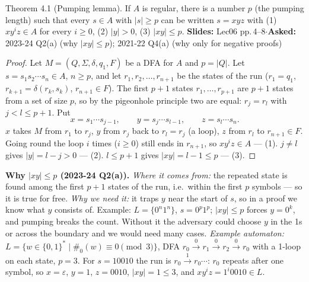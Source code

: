 \documentclass[10.5pt,a4paper]{article}
\newcommand{\src}[2]{{\footnotesize\color{gray!70!black}\textbf{Slides:} #1\enspace$\cdot$\enspace\textbf{Asked:} #2}\par}
\newcommand{\eps}{\varepsilon}
\begin{document}
\begin{thm}{Theorem 4.1 (Pumping lemma). If $A$ is regular, there is a number $p$ (the pumping length) such that every $s\in A$ with
$|s|\ge p$ can be written $s=xyz$ with (1) $xy^iz\in A$ for every $i\ge0$, (2) $|y|>0$, (3) $|xy|\le p$.}
\src{Lec06 pp.\,4--8}{2023-24 Q2(a) (why $|xy|\le p$); 2021-22 Q4(a) (why only for negative proofs)}
\end{thm}
\begin{proof}
Let $M=(Q,\Sigma,\delta,q_1,F)$ be a DFA for $A$ and $p=|Q|$. Let $s=s_1s_2\cdots s_n\in A$, $n\ge p$, and let $r_1,r_2,\dots,r_{n+1}$ be the
states of the run ($r_1=q_1$, $r_{k+1}=\delta(r_k,s_k)$, $r_{n+1}\in F$). The first $p+1$ states $r_1,\dots,r_{p+1}$ are $p+1$ states from a set of
size $p$, so by the pigeonhole principle two are equal: $r_j=r_l$ with $j<l\le p+1$. Put
\[x=s_1\cdots s_{j-1},\qquad y=s_j\cdots s_{l-1},\qquad z=s_l\cdots s_n.\]
$x$ takes $M$ from $r_1$ to $r_j$, $y$ from $r_j$ back to $r_l=r_j$ (a loop), $z$ from $r_l$ to $r_{n+1}\in F$. Going round the loop $i$ times
($i\ge0$) still ends in $r_{n+1}$, so $xy^iz\in A$ --- (1). $j\ne l$ gives $|y|=l-j>0$ --- (2). $l\le p+1$ gives $|xy|=l-1\le p$ --- (3).
\end{proof}
\begin{center}
\end{center}

\textbf{Why $|xy|\le p$ (2023-24 Q2(a)).} \emph{Where it comes from:} the repeated state is found among the first $p+1$ states of the run,
i.e.\ within the first $p$ symbols --- so it is true for free. \emph{Why we need it:} it traps $y$ near the start of $s$, so in a proof we know
what $y$ consists of. Example: $L=\{0^n1^n\}$, $s=0^p1^p$; $|xy|\le p$ forces $y=0^k$, and pumping breaks the count. Without it the adversary
could choose $y$ in the 1s or across the boundary and we would need many cases. \emph{Example automaton:} $L=\{w\in\{0,1\}^*\mid \#_0(w)\equiv0
\pmod 3\}$, DFA $r_0\xrightarrow{0}r_1\xrightarrow{0}r_2\xrightarrow{0}r_0$ with a 1-loop on each state, $p=3$. For $s=10010$ the run is
$r_0\xrightarrow{1}r_0\cdots$: $r_0$ repeats after one symbol, so $x=\eps$, $y=1$, $z=0010$, $|xy|=1\le3$, and $xy^iz=1^i0010\in L$.
\end{document}
